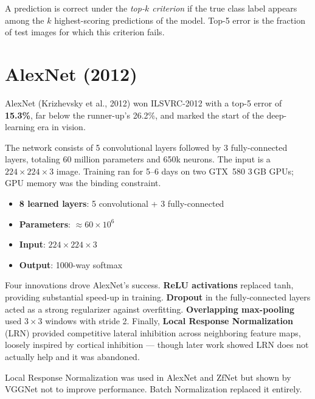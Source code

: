 \documentclass[11pt, oneside]{book}
\begin{document}
\begin{defbox}[title={Top-$k$ Error}]
A prediction is correct under the \emph{top-$k$ criterion} if the true class label
appears among the $k$ highest-scoring predictions of the model.
Top-5 error is the fraction of test images for which this criterion fails.
\end{defbox}

\section{AlexNet (2012)}

AlexNet (Krizhevsky et al., 2012) won ILSVRC-2012 with a top-5 error of \textbf{15.3\%},
far below the runner-up's 26.2\%, and marked the start of the deep-learning era in vision.

The network consists of 5 convolutional layers followed by 3 fully-connected layers,
totaling 60 million parameters and 650k neurons.
The input is a $224 \times 224 \times 3$ image.
Training ran for 5–6 days on two GTX~580 3\,GB GPUs; GPU memory was the binding constraint.

\begin{defbox}[title={AlexNet Architecture}]
\begin{itemize}
  \item \textbf{8 learned layers}: 5 convolutional + 3 fully-connected
  \item \textbf{Parameters}: $\approx 60 \times 10^6$
  \item \textbf{Input}: $224 \times 224 \times 3$
  \item \textbf{Output}: 1000-way softmax
\end{itemize}
\end{defbox}

Four innovations drove AlexNet's success.
\textbf{ReLU activations} replaced tanh, providing substantial speed-up in training.
\textbf{Dropout} in the fully-connected layers acted as a strong regularizer against overfitting.
\textbf{Overlapping max-pooling} used $3\times3$ windows with stride 2.
Finally, \textbf{Local Response Normalization} (LRN) provided competitive lateral inhibition
across neighboring feature maps, loosely inspired by cortical inhibition —
though later work showed LRN does not actually help and it was abandoned.

\begin{notebox}[title={LRN is obsolete}]
Local Response Normalization was used in AlexNet and ZfNet but shown by VGGNet
not to improve performance. Batch Normalization replaced it entirely.
\end{notebox}
\end{document}
